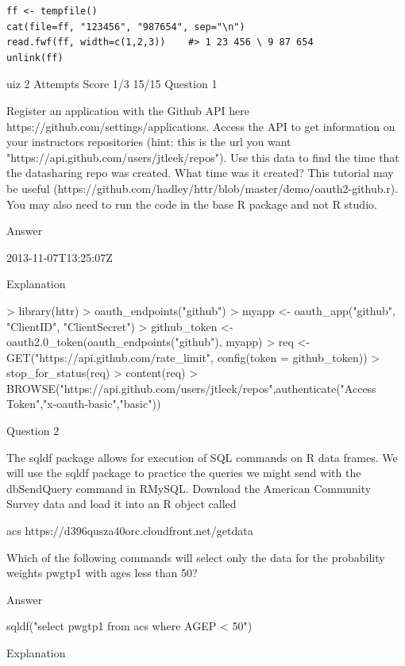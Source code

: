 \begin{framed}
\begin{verbatim}
ff <- tempfile()
cat(file=ff, "123456", "987654", sep="\n")
read.fwf(ff, width=c(1,2,3))    #> 1 23 456 \ 9 87 654
unlink(ff)
\end{verbatim}
\end{framed}



uiz 2
Attempts	Score
1/3	15/15
Question 1

Register an application with the Github API here https://github.com/settings/applications. Access the API to get information on your instructors repositories (hint: this is the url you want "https://api.github.com/users/jtleek/repos"). Use this data to find the time that the datasharing repo was created. What time was it created? This tutorial may be useful (https://github.com/hadley/httr/blob/master/demo/oauth2-github.r). You may also need to run the code in the base R package and not R studio.

Answer

2013-11-07T13:25:07Z

Explanation

> library(httr)
> oauth_endpoints("github")
> myapp <- oauth_app("github", "ClientID", "ClientSecret")
> github_token <- oauth2.0_token(oauth_endpoints("github"), myapp)
> req <- GET("https://api.github.com/rate_limit", config(token = github_token))
> stop_for_status(req)
> content(req)
> BROWSE("https://api.github.com/users/jtleek/repos",authenticate("Access Token","x-oauth-basic","basic"))

Question 2

The sqldf package allows for execution of SQL commands on R data frames. We will use the sqldf package to practice the queries we might send with the dbSendQuery command in RMySQL. Download the American Community Survey data and load it into an R object called

acs
https://d396qusza40orc.cloudfront.net/getdata%

Which of the following commands will select only the data for the probability weights pwgtp1 with ages less than 50?

Answer

sqldf("select pwgtp1 from acs where AGEP < 50")

Explanation

